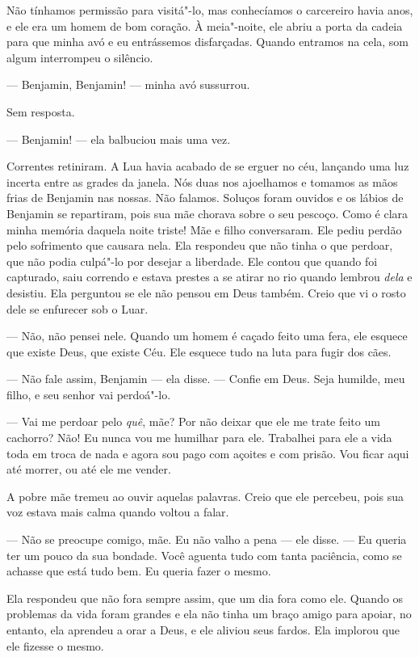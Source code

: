 Não tínhamos permissão para visitá"-lo,
mas conhecíamos o carcereiro havia anos, e ele era um homem de bom
coração. À meia"-noite, ele abriu a porta da cadeia para que minha avó e
eu entrássemos disfarçadas. Quando entramos na cela, som algum
interrompeu o silêncio.

--- Benjamin, Benjamin! --- minha avó sussurrou.

Sem resposta.

--- Benjamin! --- ela balbuciou mais uma vez.

Correntes retiniram. A Lua havia acabado de se erguer no céu, lançando
uma luz incerta entre as grades da janela. Nós duas nos ajoelhamos e
tomamos as mãos frias de Benjamin nas nossas. Não falamos. Soluços foram
ouvidos e os lábios de Benjamin se repartiram, pois sua mãe chorava
sobre o seu pescoço. Como é clara minha memória daquela noite triste!
Mãe e filho conversaram. Ele pediu perdão pelo sofrimento que causara
nela. Ela respondeu que não tinha o que perdoar, que não podia culpá"-lo
por desejar a liberdade. Ele contou que quando foi capturado, saiu
correndo e estava prestes a se atirar no rio quando lembrou \emph{dela}
e desistiu. Ela perguntou se ele não pensou em Deus também. Creio que vi
o rosto dele se enfurecer sob o Luar.

--- Não, não pensei nele. Quando um homem é caçado feito uma fera, ele
esquece que existe Deus, que existe Céu. Ele esquece tudo na luta para
fugir dos cães.

--- Não fale assim, Benjamin --- ela
disse. --- Confie em Deus. Seja humilde, meu filho, e seu senhor vai
perdoá"-lo.

--- Vai me perdoar pelo \emph{quê},
mãe? Por não deixar que ele me trate feito um cachorro? Não! Eu nunca
vou me humilhar para ele. Trabalhei para ele a vida toda em troca de
nada e agora sou pago com açoites e com prisão. Vou ficar aqui até
morrer, ou até ele me vender.

A pobre mãe tremeu ao ouvir aquelas
palavras. Creio que ele percebeu, pois sua voz estava mais calma quando
voltou a falar.

--- Não se preocupe comigo, mãe. Eu não valho a pena --- ele disse. ---
Eu queria ter um pouco da sua bondade. Você aguenta tudo com tanta
paciência, como se achasse que está tudo bem. Eu queria fazer o mesmo.

Ela respondeu que não fora sempre
assim, que um dia fora como ele. Quando os problemas da vida foram
grandes e ela não tinha um braço amigo para apoiar, no entanto, ela
aprendeu a orar a Deus, e ele aliviou seus fardos. Ela implorou que ele
fizesse o mesmo.

